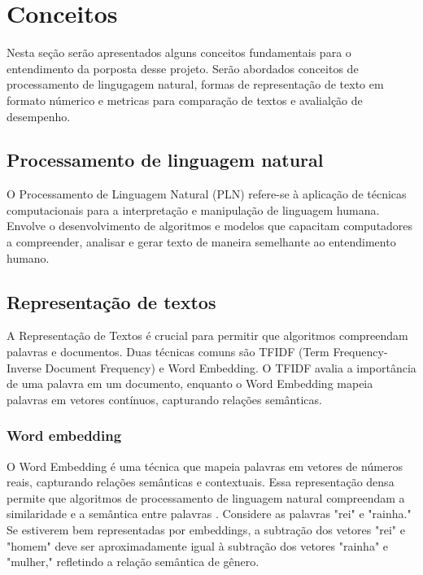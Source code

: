 \chapter{Conceitos}

Nesta seção serão apresentados alguns conceitos fundamentais para o entendimento da porposta desse projeto. Serão abordados conceitos de processamento de lingugagem natural, formas de representação de texto em formato númerico e metricas para comparação de textos e avalialção de desempenho.

\section{Processamento de linguagem natural}

O Processamento de Linguagem Natural (PLN) refere-se à aplicação de técnicas computacionais para a interpretação e manipulação de linguagem humana. Envolve o desenvolvimento de algoritmos e modelos que capacitam computadores a compreender, analisar e gerar texto de maneira semelhante ao entendimento humano.

\section{Representação de textos}

A Representação de Textos é crucial para permitir que algoritmos compreendam palavras e documentos. Duas técnicas comuns são TFIDF (Term Frequency-Inverse Document Frequency) e Word Embedding. O TFIDF avalia a importância de uma palavra em um documento, enquanto o Word Embedding mapeia palavras em vetores contínuos, capturando relações semânticas.


\subsection{Word embedding}
O Word Embedding é uma técnica que mapeia palavras em vetores de números reais, capturando relações semânticas e contextuais. Essa representação densa permite que algoritmos de processamento de linguagem natural compreendam a similaridade e a semântica entre palavras \cite{NLP}. Considere as palavras "rei" e "rainha." Se estiverem bem representadas por embeddings, a subtração dos vetores "rei" e "homem" deve ser aproximadamente igual à subtração dos vetores "rainha" e "mulher," refletindo a relação semântica de gênero.

